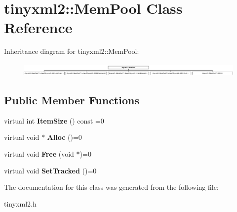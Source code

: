 \hypertarget{classtinyxml2_1_1_mem_pool}{\section{tinyxml2\-:\-:Mem\-Pool Class Reference}
\label{classtinyxml2_1_1_mem_pool}
}
Inheritance diagram for tinyxml2\-:\-:Mem\-Pool\-:\begin{figure}[H]
\begin{center}
\leavevmode
\includegraphics[height=0.691358cm]{classtinyxml2_1_1_mem_pool}
\end{center}
\end{figure}
\subsection*{Public Member Functions}
\begin{DoxyCompactItemize}
\item 
\hypertarget{classtinyxml2_1_1_mem_pool_a0c518d49e3a94bde566f61e13b7240bb}{virtual int {\bfseries Item\-Size} () const =0}\label{classtinyxml2_1_1_mem_pool_a0c518d49e3a94bde566f61e13b7240bb}

\item 
\hypertarget{classtinyxml2_1_1_mem_pool_a4f977b5fed752c0bbfe5295f469d6449}{virtual void $\ast$ {\bfseries Alloc} ()=0}\label{classtinyxml2_1_1_mem_pool_a4f977b5fed752c0bbfe5295f469d6449}

\item 
\hypertarget{classtinyxml2_1_1_mem_pool_a49e3bfac2cba2ebd6776b31e571f64f7}{virtual void {\bfseries Free} (void $\ast$)=0}\label{classtinyxml2_1_1_mem_pool_a49e3bfac2cba2ebd6776b31e571f64f7}

\item 
\hypertarget{classtinyxml2_1_1_mem_pool_ac5804dd1387b2e4de5eef710076a0db1}{virtual void {\bfseries Set\-Tracked} ()=0}\label{classtinyxml2_1_1_mem_pool_ac5804dd1387b2e4de5eef710076a0db1}

\end{DoxyCompactItemize}


The documentation for this class was generated from the following file\-:\begin{DoxyCompactItemize}
\item 
tinyxml2.\-h\end{DoxyCompactItemize}
